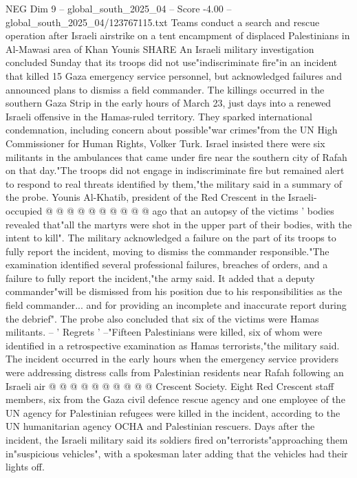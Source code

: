\begin{textsample}{NEG Dim 9 – global\_south\_2025\_04 – Score -4.00 – global\_south\_2025\_04/123767115.txt}  \label{ex:f9_neg_296}
Teams conduct a search and rescue operation after Israeli airstrike on a tent encampment of displaced Palestinians in Al-Mawasi area of Khan Younis SHARE An Israeli military investigation concluded Sunday that its troops did not use"indiscriminate fire"in an incident that killed 15 Gaza emergency service personnel, but acknowledged failures and announced plans to dismiss a field commander.
The killings occurred in the southern Gaza Strip in the early hours of March 23, just days into a renewed Israeli offensive in the Hamas-ruled territory.
They sparked international condemnation, including concern about possible"war crimes"from the UN High Commissioner for Human Rights, Volker Turk.
Israel insisted there were six militants in the ambulances that came under fire near the southern city of Rafah on that day."The troops did not engage in indiscriminate fire but remained alert to respond to real threats identified by them,"the military said in a summary of the probe.
Younis Al-Khatib, president of the Red Crescent in the Israeli-occupied @ @ @ @ @ @ @ @ @ @ ago that an autopsy of the victims ' bodies revealed that"all the martyrs were shot in the upper part of their bodies, with the intent to kill".
The military acknowledged a failure on the part of its troops to fully report the incident, moving to dismiss the commander responsible."The examination identified several professional failures, breaches of orders, and a failure to fully report the incident,"the army said.
It added that a deputy commander"will be dismissed from his position due to his responsibilities as the field commander... and for providing an incomplete and inaccurate report during the debrief".
The probe also concluded that six of the victims were Hamas militants. -- ' Regrets ' --"Fifteen Palestinians were killed, six of whom were identified in a retrospective examination as Hamas terrorists,"the military said.
The incident occurred in the early hours when the emergency service providers were addressing distress calls from Palestinian residents near Rafah following an Israeli air @ @ @ @ @ @ @ @ @ @ Crescent Society.
Eight Red Crescent staff members, six from the Gaza civil defence rescue agency and one employee of the UN agency for Palestinian refugees were killed in the incident, according to the UN humanitarian agency OCHA and Palestinian rescuers.
Days after the incident, the Israeli military said its soldiers fired on"terrorists"approaching them in"suspicious vehicles", with a spokesman later adding that the vehicles had their lights off.

\end{textsample}
